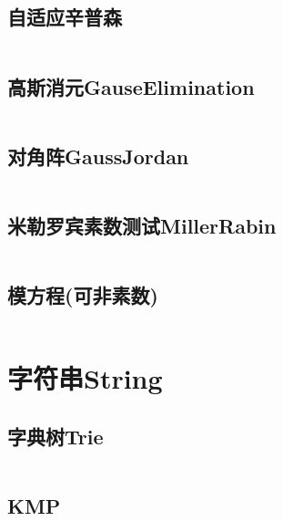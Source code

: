\documentclass[twoside,sub3section,UTF8]{ctexart}						%
\begin{document}
	\subsection{自适应辛普森}
		\inputminted{c++}{"Maths/Simpson.cpp"}
	\subsection{高斯消元GauseElimination}
		\inputminted{c++}{"Maths/GaussElimination.cpp"}
	\subsection{对角阵GaussJordan}
		\inputminted{c++}{"Maths/GaussJordan.cpp"}
	\subsection{米勒罗宾素数测试MillerRabin}
		\inputminted{c++}{"Maths/MillerRabin.cpp"}
	\subsection{模方程(可非素数)}
		\inputminted{c++}{"Maths/modEquation.cpp"}


\section{字符串String}
	\subsection{字典树Trie}
		\inputminted{c++}{"String/Trie.cpp"}
	\subsection{KMP}
		\inputminted{c++}{"String/KMP.cpp"}
\end{document}
